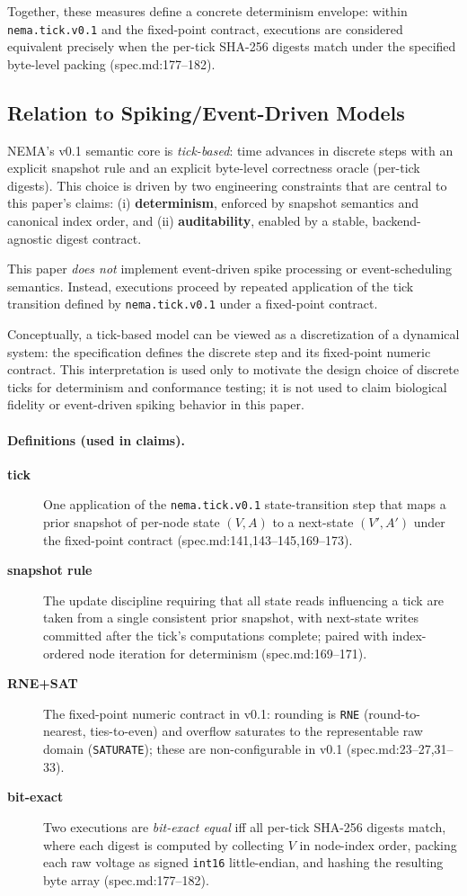 Together, these measures define a concrete determinism envelope: within \texttt{nema.tick.v0.1} and the fixed-point contract, executions are considered equivalent precisely when the per-tick SHA-256 digests match under the specified byte-level packing (spec.md:177–182).

\subsection{Relation to Spiking/Event-Driven Models}
NEMA’s v0.1 semantic core is \emph{tick-based}: time advances in discrete steps with an explicit snapshot rule and an explicit byte-level correctness oracle (per-tick digests). This choice is driven by two engineering constraints that are central to this paper’s claims: (i) \textbf{determinism}, enforced by snapshot semantics and canonical index order, and (ii) \textbf{auditability}, enabled by a stable, backend-agnostic digest contract.

This paper \emph{does not} implement event-driven spike processing or event-scheduling semantics. Instead, executions proceed by repeated application of the tick transition defined by \texttt{nema.tick.v0.1} under a fixed-point contract.

Conceptually, a tick-based model can be viewed as a discretization of a dynamical system: the specification defines the discrete step and its fixed-point numeric contract. This interpretation is used only to motivate the design choice of discrete ticks for determinism and conformance testing; it is not used to claim biological fidelity or event-driven spiking behavior in this paper.

\paragraph{Definitions (used in claims).}
\begin{description}
\item[\textbf{tick}] One application of the \texttt{nema.tick.v0.1} state-transition step that maps a prior snapshot of per-node state $(V,A)$ to a next-state $(V',A')$ under the fixed-point contract (spec.md:141,143–145,169–173).
\item[\textbf{snapshot rule}] The update discipline requiring that all state reads influencing a tick are taken from a single consistent prior snapshot, with next-state writes committed after the tick’s computations complete; paired with index-ordered node iteration for determinism (spec.md:169–171).
\item[\textbf{RNE+SAT}] The fixed-point numeric contract in v0.1: rounding is \texttt{RNE} (round-to-nearest, ties-to-even) and overflow saturates to the representable raw domain (\texttt{SATURATE}); these are non-configurable in v0.1 (spec.md:23–27,31–33).
\item[\textbf{bit-exact}] Two executions are \emph{bit-exact equal} iff all per-tick SHA-256 digests match, where each digest is computed by collecting $V$ in node-index order, packing each raw voltage as signed \texttt{int16} little-endian, and hashing the resulting byte array (spec.md:177–182).
\end{description}
